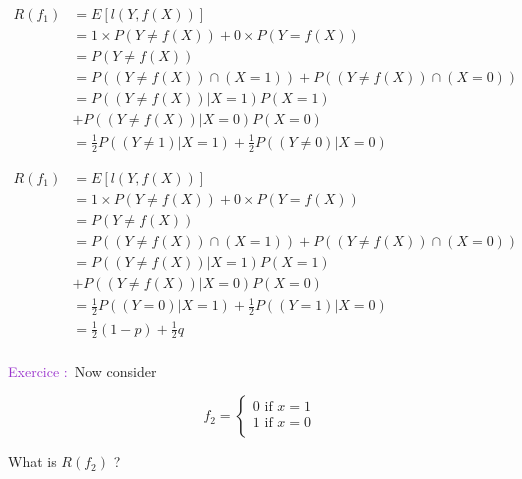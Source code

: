 \documentclass[usenames,dvipsnames]{beamer}
\newcounter{numexos}%
\newcommand{\exercice}[1]{%
\addtocounter{numexos}{1}%
\textcolor{DarkOrchid}{Exercice\,\thenumexos\,:}\,#1%
}
\begin{document}
\begin{frame}{}
    \begin{equation}
        \begin{aligned}
            \label{eq:}
            R(f_1)&= E[l(Y, f(X))] \\
            &= 1\times P(Y\neq f(X))+ 0\times P(Y=f(X))\\
            &= P(Y\neq f(X))\\
            &= P((Y\neq f(X))\cap (X=1))+P((Y\neq f(X))\cap (X=0))\\
            &= P((Y\neq f(X))| X=1)P(X=1)\\
            &+P((Y\neq f(X))| X=0)P(X=0)\\
            &= \frac{1}{2}P((Y\neq 1)| X=1) + \frac{1}{2} P((Y\neq 0)| X=0)
        \end{aligned}
    \end{equation}
\end{frame}

\begin{frame}{}
    \begin{equation}
        \begin{aligned}
            \label{eq:}
            R(f_1)&= E[l(Y, f(X))] \\
            &= 1\times P(Y\neq f(X))+ 0\times P(Y=f(X))\\
            &= P(Y\neq f(X))\\
            &= P((Y\neq f(X))\cap (X=1))+P((Y\neq f(X))\cap (X=0))\\
            &= P((Y\neq f(X))| X=1)P(X=1)\\
            &+P((Y\neq f(X))| X=0)P(X=0)\\
            &= \frac{1}{2}P((Y= 0)| X=1) + \frac{1}{2} P((Y= 1)| X=0)\\
            &= \frac{1}{2}(1-p) + \frac{1}{2} q\\
        \end{aligned}
    \end{equation}
\end{frame}


\begin{frame}{}
    \exercice{} Now consider
    \addtocounter{numexos}{-1}
         $$
            f_2 = \left\{
                \begin{array}{ll}
                    0 \text{ if } x=1   \\
                    1 \text{ if } x=0   \\
                \end{array}
                \right.
                $$

                What is $R(f_2)$ ?
\end{frame}
\end{document}
